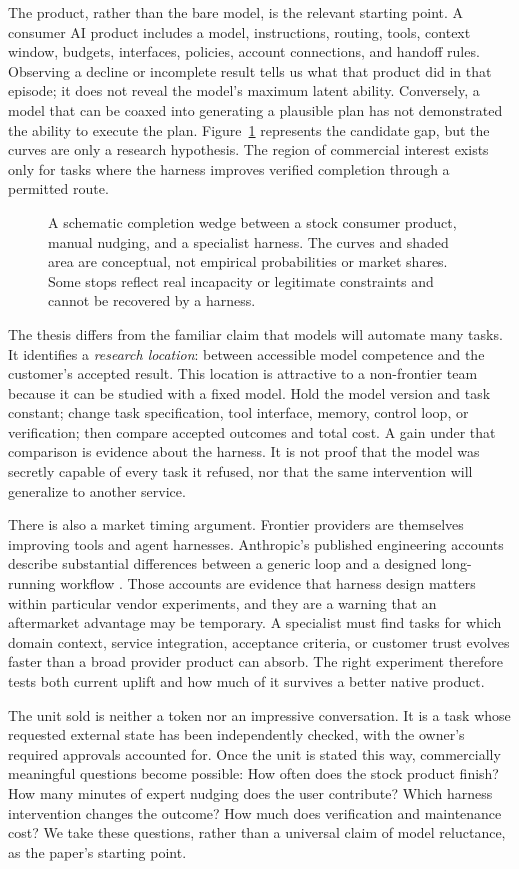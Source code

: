 The product, rather than the bare model, is the relevant starting point. A consumer AI product includes a model, instructions, routing, tools, context window, budgets, interfaces, policies, account connections, and handoff rules. Observing a decline or incomplete result tells us what that product did in that episode; it does not reveal the model's maximum latent ability. Conversely, a model that can be coaxed into generating a plausible plan has not demonstrated the ability to execute the plan. Figure~\ref{fig:wedge} represents the candidate gap, but the curves are only a research hypothesis. The region of commercial interest exists only for tasks where the harness improves verified completion through a permitted route.

\begin{figure}[tbp]
\centering
\caption{A schematic completion wedge between a stock consumer product, manual nudging, and a specialist harness. The curves and shaded area are conceptual, not empirical probabilities or market shares. Some stops reflect real incapacity or legitimate constraints and cannot be recovered by a harness.}
\label{fig:wedge}
\end{figure}

The thesis differs from the familiar claim that models will automate many tasks. It identifies a \emph{research location}: between accessible model competence and the customer's accepted result. This location is attractive to a non-frontier team because it can be studied with a fixed model. Hold the model version and task constant; change task specification, tool interface, memory, control loop, or verification; then compare accepted outcomes and total cost. A gain under that comparison is evidence about the harness. It is not proof that the model was secretly capable of every task it refused, nor that the same intervention will generalize to another service.

There is also a market timing argument. Frontier providers are themselves improving tools and agent harnesses. Anthropic's published engineering accounts describe substantial differences between a generic loop and a designed long-running workflow \citep{anthropiclong,anthropic2026}. Those accounts are evidence that harness design matters within particular vendor experiments, and they are a warning that an aftermarket advantage may be temporary. A specialist must find tasks for which domain context, service integration, acceptance criteria, or customer trust evolves faster than a broad provider product can absorb. The right experiment therefore tests both current uplift and how much of it survives a better native product.

The unit sold is neither a token nor an impressive conversation. It is a task whose requested external state has been independently checked, with the owner’s required approvals accounted for. Once the unit is stated this way, commercially meaningful questions become possible: How often does the stock product finish? How many minutes of expert nudging does the user contribute? Which harness intervention changes the outcome? How much does verification and maintenance cost? We take these questions, rather than a universal claim of model reluctance, as the paper's starting point.
